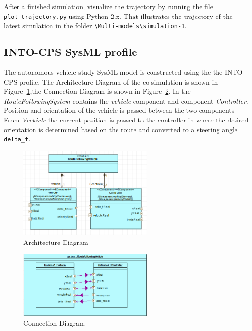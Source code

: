 After a finished simulation, visualize the trajectory by running the file \texttt{plot\_trajectory.py} using Python 2.x. That illustrates the trajectory of the latest simulation in the folder \texttt{\textbackslash Multi-models\textbackslash si\-mu\-la\-tion-1}.

\subsection{INTO-CPS SysML profile}
The autonomous vehicle study SysML model is constructed using the the INTO-CPS profile. The Architecture Diagram of the co-simulation is shown in Figure~\ref{fig:bicycle_architecture_diagram},the Connection Diagram is shown in Figure~\ref{fig:bicycle_connection_diagram}.
In the \textit{RouteFollowingSystem} contains the \textit{vehicle} component and component \textit{Controller}. Position and orientation of the vehicle is passed between the two components. From \textit{Vechicle} the current position is passed to the controller in where the desired orientation is determined based on the route and converted to a steering angle \texttt{delta\_f}. 
	\begin{figure}[htbp]
	\begin{center}
		\includegraphics[width=0.6\textwidth]{vehicle/architecture_structure_diagram.png}
		\caption{Architecture Diagram}
		\label{fig:bicycle_architecture_diagram}
	\end{center}
\end{figure}
\begin{figure}[htbp]
	\begin{center}
		\includegraphics[width=0.6\textwidth]{vehicle/connection_diagram.png}
		\caption{Connection Diagram}
		\label{fig:bicycle_connection_diagram}
	\end{center}
\end{figure}

